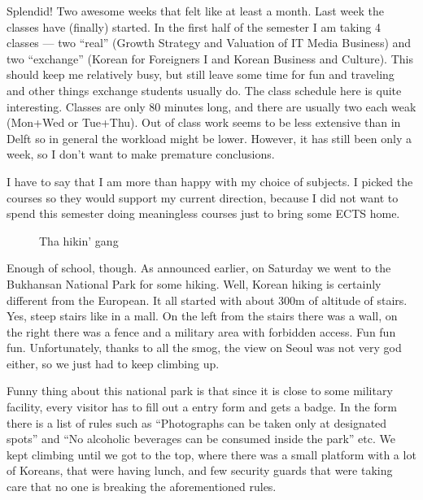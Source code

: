 
\begin{post}
	\begin{content}
Splendid! Two awesome weeks that felt like at least a month. Last week the classes have (finally) started. In the first half of the semester I am taking 4 classes --- two ``real'' (Growth Strategy and Valuation of IT Media Business) and two ``exchange'' (Korean for Foreigners I and Korean Business and Culture). This should keep me relatively busy, but still leave some time for fun and traveling and other things exchange students usually do. The class schedule here is quite interesting. Classes are only 80 minutes long, and there are usually two each weak (Mon+Wed or Tue+Thu). Out of class work seems to be less extensive than in Delft so in general the workload might be lower. However, it has still been only a week, so I don't want to make premature conclusions.

I have to say that I am more than happy with my choice of subjects. I picked the courses so they would support my current direction, because I did not want to spend this semester doing meaningless courses just to bring some ECTS home.

\begin{figure}
\centering\vspace{-12pt}
\caption*{Tha hikin' gang}
\vspace{-25pt}
\end{figure}Enough of school, though. As announced earlier, on Saturday we went to the Bukhansan National Park for some hiking. Well, Korean hiking is certainly different from the European. It all started with about 300m of altitude of stairs. Yes, steep stairs like in a mall. On the left from the stairs there was a wall, on the right there was a fence and a military area with forbidden access. Fun fun fun. Unfortunately, thanks to all the smog, the view on Seoul was not very god either, so we just had to keep climbing up.

Funny thing about this national park is that since it is close to some military facility, every visitor has to fill out a entry form and gets a badge. In the form there is a list of rules such as ``Photographs can be taken only at designated spots'' and ``No alcoholic beverages can be consumed inside the park'' etc. We kept climbing until we got to the top, where there was a small platform with a lot of Koreans, that were having lunch, and few security guards that were taking care that no one is breaking the aforementioned rules.


\end{content}
\end{post}
